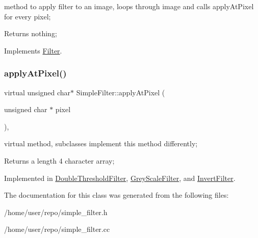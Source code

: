method to apply filter to an image, loops through image and calls apply\+At\+Pixel for every pixel; 

\begin{DoxyReturn}{Returns}
nothing; 
\end{DoxyReturn}


Implements \hyperlink{classFilter_afab0d50af44a19a370ebe46c69b8ff4e}{Filter}.

\mbox{\label{classSimpleFilter_a24100e6c29c4bf3bddf2763c22622d75}} 
\subsubsection{\texorpdfstring{apply\+At\+Pixel()}{applyAtPixel()}}
{\footnotesize\ttfamily virtual unsigned char$\ast$ Simple\+Filter\+::apply\+At\+Pixel (\begin{DoxyParamCaption}\item[{unsigned char $\ast$}]{pixel }\end{DoxyParamCaption})\hspace{0.3cm}{\ttfamily [protected]}, {}}



virtual method, subclasses implement this method differently; 

\begin{DoxyReturn}{Returns}
a length 4 character array; 
\end{DoxyReturn}


Implemented in \hyperlink{classDoubleThresholdFilter_ab6e5b2d489d32913b8cb1854d4ba6db2}{Double\+Threshold\+Filter}, \hyperlink{classGreyScaleFilter_afac3eb54599341d326d9df20de67f851}{Grey\+Scale\+Filter}, and \hyperlink{classInvertFilter_a440496aa9fb53511c32e451aaefb52a4}{Invert\+Filter}.



The documentation for this class was generated from the following files\+:\begin{DoxyCompactItemize}
\item 
/home/user/repo/simple\+\_\+filter.\+h\item 
/home/user/repo/simple\+\_\+filter.\+cc\end{DoxyCompactItemize}
